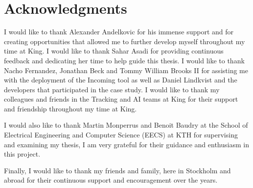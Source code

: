 
\clearpage
\chapter*{Acknowledgments}

I would like to thank Alexander Andelkovic for his immense support and for creating opportunities that allowed me to further develop myself throughout my time at King. I would like to thank Sahar Asadi for providing continuous feedback and dedicating her time to help guide this thesis. I would like to thank Nacho Fernandez, Jonathan Beck and Tommy William Brooks II for assisting me with the deployment of the Incoming tool as well as Daniel Lindkvist and the developers that participated in the case study.  I would like to thank my colleagues and friends in the Tracking and AI teams at King for their support and friendship throughout my time at King. 

I would also like to thank Martin Monperrus and Benoit Baudry at the School of Electrical Engineering and Computer Science (EECS) at KTH for supervising and examining my thesis, I am very grateful for their guidance and enthusiasm in this project.

Finally, I would like to thank my friends and family, here in Stockholm and abroad for their continuous support and encouragement over the years. 

\clearpage